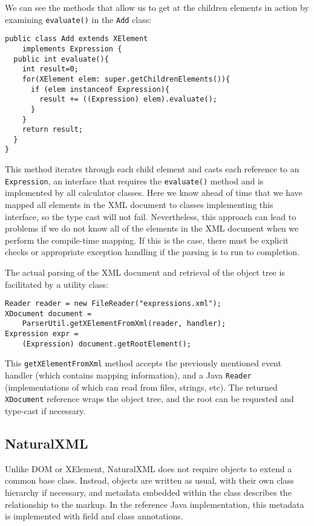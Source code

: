 We can see the methods that allow us to get at the children elements
in action by examining \lstinline{evaluate()} in the
\lstinline'Add' class:
\begin{lstlisting} 
public class Add extends XElement
    implements Expression {
  public int evaluate(){
    int result=0;
    for(XElement elem: super.getChildrenElements()){
      if (elem instanceof Expression){
        result += ((Expression) elem).evaluate();
      }
    }
    return result;
  }
}
\end{lstlisting} 

This method iterates through each child element and casts each
reference to an \lstinline'Expression', an interface that requires the
\lstinline'evaluate()' method and is implemented by all calculator
classes.  Here we know ahead of time that we have mapped all elements
in the XML document to classes implementing this interface, so the
type cast will not fail.  Nevertheless, this approach can lead to
problems if we do not know all of the elements in the XML document
when we perform the compile-time mapping.  If this is the case, there
must be explicit checks or appropriate exception handling if the
parsing is to run to completion.

The actual parsing of the XML document and retrieval of the object
tree is facilitated by a utility class:
\begin{lstlisting}
Reader reader = new FileReader("expressions.xml");
XDocument document = 
    ParserUtil.getXElementFromXml(reader, handler);
Expression expr = 
    (Expression) document.getRootElement();  
\end{lstlisting}
This \lstinline{getXElementFromXml} method accepts the previously
mentioned event handler (which contains mapping information), and a
Java \lstinline{Reader} (implementations of which can read from files,
strings, etc). The returned \lstinline{XDocument} reference wraps the
object tree, and the root can be requested and type-cast if necessary.

\subsection{NaturalXML}
Unlike DOM or XElement, NaturalXML does not require objects to extend
a common base class.  Instead, objects are written as usual, with
their own class hierarchy if necessary, and metadata embedded within
the class describes the relationship to the markup.  In the reference
Java implementation, this metadata is implemented with field and class 
annotations.

